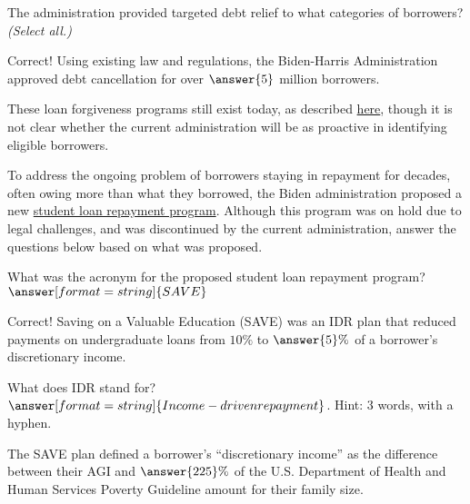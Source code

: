 \documentclass[handout,space,nooutcomes]{ximera}
\begin{document}
\begin{question}
The administration provided targeted debt relief to what categories of borrowers?  \emph{(Select all.)}
\begin{selectAll}
\end{selectAll}
\begin{question}
Correct!  Using existing law and regulations, the Biden-Harris Administration approved debt cancellation for over $\answer{5}$ million borrowers.  

These loan forgiveness programs still exist today, as described \href{https://studentaid.gov/manage-loans/forgiveness-cancellation}{here}, though it is not clear whether the current administration will be as proactive in identifying eligible borrowers.  

To address the ongoing problem of borrowers staying in repayment for decades, often owing more than what they borrowed, the Biden administration proposed a new \href{https://bidenwhitehouse.archives.gov/briefing-room/statements-releases/2023/08/22/fact-sheet-the-biden-harris-administration-launches-the-save-plan-the-most-affordable-student-loan-repayment-plan-ever-to-lower-monthly-payments-for-millions-of-borrowers/}{student loan repayment program}.  Although this program was on hold due to legal challenges, and was discontinued by the current administration, 
answer the questions below based on what was proposed.  

\begin{question}
What was the acronym for the proposed student loan repayment program?  $\answer[format=string]{SAVE}$
\begin{question}
Correct!  Saving on a Valuable Education (SAVE) was an IDR plan that reduced payments on undergraduate loans from $10\%$ to $\answer{5}\%$ of a borrower's
discretionary income.  

What does IDR stand for?  $\answer[format=string]{Income-driven repayment}$.  Hint: 3 words, with a hyphen. 

The SAVE plan defined a borrower's ``discretionary income'' as the difference between their AGI and $\answer{225}\%$ of the U.S. Department of Health and Human Services Poverty Guideline amount for their family size.  


\end{question}
\end{question}
\end{question}
\end{question}
\end{document}
